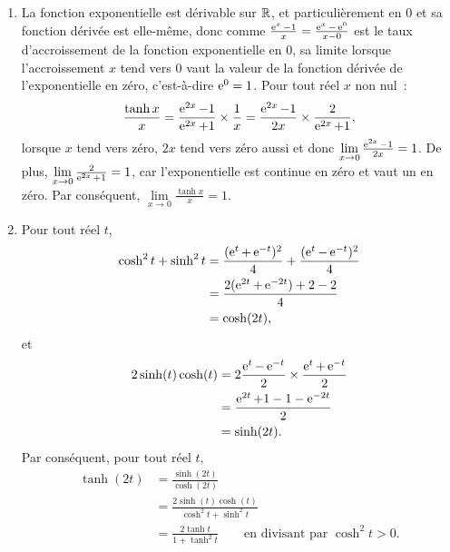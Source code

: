 \begin{exercice}
    \begin{enumerate}
        \item La fonction exponentielle est dérivable sur \(\mathbb{R}\), et particulièrement en \(0\) et sa fonction dérivée est elle-même, donc comme \(\frac{\operatorname{e}^x-1}{x} = \frac{\operatorname{e}^x-\operatorname{e}^0}{x-0}\) est le taux d'accroissement de la fonction exponentielle en \(0\), sa limite lorsque l'accroissement \(x\) tend vers \(0\) vaut la valeur de la fonction dérivée de l'exponentielle en zéro, c'est-à-dire \(\operatorname{e}^0 = 1\).
            Pour tout réel \(x\) non nul~:
            \begin{equation*}
                \frac{\tanh x}{x} = \frac{\operatorname{e}^{2x}-1}{\operatorname{e}^{2x}+1} \times \frac{1}{x} = \frac{\operatorname{e}^{2x}-1}{2x} \times \frac{2}{\operatorname{e}^{2x}+1},
            \end{equation*}
            lorsque \(x\) tend vers zéro, \(2x\) tend vers zéro aussi et donc \(\lim\limits_{x \to 0}\frac{\operatorname{e}^{2x}-1}{2x} = 1\). De plus, \(\lim\limits_{x \to 0} \frac{2}{\operatorname{e}^{2x}+1} = 1\), car l'exponentielle est continue en zéro et vaut un en zéro. Par conséquent, \(\lim\limits_{x \to 0} \frac{\tanh x}{x} = 1\).
        \item Pour tout réel \(t\),
            \begin{align*}
                \cosh^2 t + \sinh^2 t   &= \frac{(\operatorname{e}^t+\operatorname{e}^{-t})^2}{4} + \frac{(\operatorname{e}^t-\operatorname{e}^{-t})^2}{4} \\
                                        &= \frac{2(\operatorname{e}^{2t}+\operatorname{e}^{-2t}) +2 -2}{4} \\
                                        &= \cosh(2t),
            \end{align*}
            et
            \begin{align*}
                2\sinh(t)\cosh(t)   &= 2 \frac{\operatorname{e}^t - \operatorname{e}^{-t}}{2} \times \frac{\operatorname{e}^t + \operatorname{e}^{-t}}{2} \\
                                    &= \frac{\operatorname{e}^{2t}+1-1-\operatorname{e}^{-2t}}{2} \\
                                    &= \sinh(2t).
            \end{align*}
            Par conséquent, pour tout réel \(t\),
            \begin{align*}
                \tanh(2t)   &= \frac{\sinh(2t)}{\cosh(2t)} \\
                            &= \frac{2\sinh(t)\cosh(t)}{\cosh^2 t + \sinh^2 t} \\
                            &= \frac{2\tanh t}{1+\tanh^2 t} \qquad \text{en divisant par~} \cosh^2 t>0.

\end{align*}
\end{enumerate}
\end{exercice}
